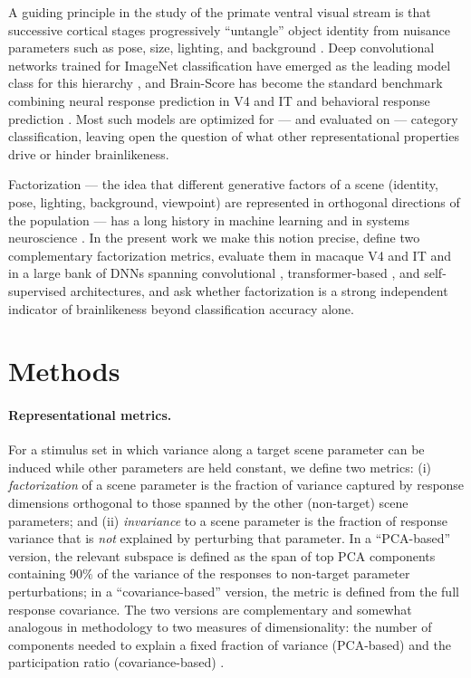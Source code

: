 \documentclass[11pt]{article}
\begin{document}
A guiding principle in the study of the primate ventral visual stream is that successive cortical stages progressively ``untangle'' object identity from nuisance parameters such as pose, size, lighting, and background \cite{dicarlo2012untangle,rust2010selectivity,hong2016explicit}. Deep convolutional networks trained for ImageNet classification have emerged as the leading model class for this hierarchy \cite{yamins2014,cadieu2014,krizhevsky2012alexnet,he2016resnet}, and Brain-Score \cite{schrimpf2020brainscore} has become the standard benchmark combining neural response prediction in V4 and IT \cite{majaj2015simple} and behavioral response prediction \cite{rajalingham2018large}. Most such models are optimized for --- and evaluated on --- category classification, leaving open the question of what other representational properties drive or hinder brainlikeness.

Factorization --- the idea that different generative factors of a scene (identity, pose, lighting, background, viewpoint) are represented in orthogonal directions of the population --- has a long history in machine learning \cite{bengio2013representation,higgins2018disentangling,locatello2019challenging} and in systems neuroscience \cite{freiwald2010patches,chang2017code,hong2016explicit}. In the present work we make this notion precise, define two complementary factorization metrics, evaluate them in macaque V4 and IT \cite{majaj2015simple} and in a large bank of DNNs spanning convolutional \cite{he2016resnet,krizhevsky2012alexnet}, transformer-based \cite{dosovitskiy2021vit,vaswani2017transformer}, and self-supervised \cite{chen2020simclr,caron2021dino} architectures, and ask whether factorization is a strong independent indicator of brainlikeness beyond classification accuracy alone.

\section{Methods}

\paragraph{Representational metrics.} For a stimulus set in which variance along a target scene parameter can be induced while other parameters are held constant, we define two metrics: (i) \emph{factorization} of a scene parameter is the fraction of variance captured by response dimensions orthogonal to those spanned by the other (non-target) scene parameters; and (ii) \emph{invariance} to a scene parameter is the fraction of response variance that is \emph{not} explained by perturbing that parameter. In a ``PCA-based'' version, the relevant subspace is defined as the span of top PCA components containing $90\%$ of the variance of the responses to non-target parameter perturbations; in a ``covariance-based'' version, the metric is defined from the full response covariance. The two versions are complementary and somewhat analogous in methodology to two measures of dimensionality: the number of components needed to explain a fixed fraction of variance (PCA-based) and the participation ratio (covariance-based) \cite{gao2017theory,stringer2019high}.
\end{document}

